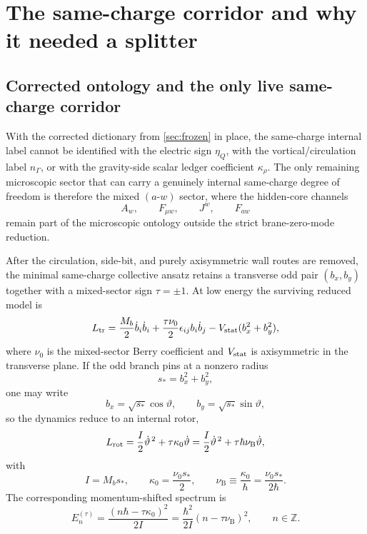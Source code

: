 \documentclass[11pt]{article}
\theoremstyle{plain}
\theoremstyle{definition}
\theoremstyle{remark}
\newcommand{\nuB}{\nu_{\mathrm{B}}}
\newcommand{\throt}{\vartheta}
\newcommand{\kapparho}{\kappa_{\rho}}
\begin{document}
\section{The same-charge corridor and why it needed a splitter}\label{sec:corridor}

\subsection{Corrected ontology and the only live same-charge corridor}\label{subsec:corridor-live}

With the corrected dictionary from \cref{sec:frozen} in place, the same-charge internal label cannot be identified with the electric sign $\eta_Q$, with the vortical/circulation label $n_\Gamma$, or with the gravity-side scalar ledger coefficient $\kapparho$. The only remaining microscopic sector that can carry a genuinely internal same-charge degree of freedom is therefore the mixed $(a\text{-}w)$ sector, where the hidden-core channels
\begin{equation}
A_w,
\qquad
F_{\mu w},
\qquad
J^w,
\qquad
F_{aw}
\label{eq:corridor-mixed-channels}
\end{equation}
remain part of the microscopic ontology outside the strict brane-zero-mode reduction.

After the circulation, side-bit, and purely axisymmetric wall routes are removed, the minimal same-charge collective ansatz retains a transverse odd pair $(b_x,b_y)$ together with a mixed-sector sign $\tau=\pm1$. At low energy the surviving reduced model is
\begin{equation}
L_{\rm tr}
=
\frac{M_b}{2}\dot b_i\dot b_i
+\frac{\tau\nu_0}{2}\epsilon_{ij}b_i\dot b_j
-V_{\rm stat}(b_x^2+b_y^2),
\label{eq:corridor-Ltr}
\end{equation}
where $\nu_0$ is the mixed-sector Berry coefficient and $V_{\rm stat}$ is axisymmetric in the transverse plane. If the odd branch pins at a nonzero radius
\begin{equation}
s_*=b_x^2+b_y^2,
\label{eq:corridor-pinned-radius}
\end{equation}
one may write
\begin{equation}
b_x=\sqrt{s_*}\cos\throt,
\qquad
b_y=\sqrt{s_*}\sin\throt,
\label{eq:corridor-polar}
\end{equation}
so the dynamics reduce to an internal rotor,
\begin{equation}
L_{\rm rot}
=
\frac{I}{2}\dot\throt^{\,2}+\tau\kappa_0\dot\throt
=
\frac{I}{2}\dot\throt^{\,2}+\tau\hbar\nuB\dot\throt,
\label{eq:corridor-Lrot}
\end{equation}
with
\begin{equation}
I=M_b s_*,
\qquad
\kappa_0=\frac{\nu_0 s_*}{2},
\qquad
\nuB\equiv\frac{\kappa_0}{\hbar}=\frac{\nu_0 s_*}{2\hbar}.
\label{eq:corridor-kappa-nuB}
\end{equation}
The corresponding momentum-shifted spectrum is
\begin{equation}
E_n^{(\tau)}
=
\frac{(n\hbar-\tau\kappa_0)^2}{2I}
=
\frac{\hbar^2}{2I}(n-\tau\nuB)^2,
\qquad n\in\mathbb Z.
\label{eq:corridor-spectrum}
\end{equation}
\end{document}
